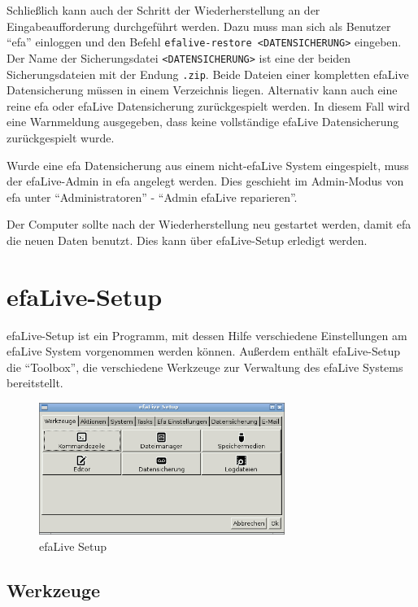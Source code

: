 \documentclass[a4paper,12pt,twoside]{article}
\begin{document}
Schließlich kann auch der Schritt der Wiederherstellung an der
Eingabeaufforderung durchgeführt werden. Dazu muss man sich als
Benutzer "`efa"' einloggen und den Befehl
\texttt{efalive-restore {\textless}DATENSICHERUNG{\textgreater}} eingeben. Der
Name der Sicherungsdatei \texttt{{\textless}DATENSICHERUNG{\textgreater}} ist
eine der beiden Sicherungsdateien mit der Endung \texttt{.zip}. Beide Dateien
einer kompletten efaLive Datensicherung müssen in einem Verzeichnis liegen. 
Alternativ kann auch eine reine efa oder efaLive Datensicherung zurückgespielt
werden. In diesem Fall wird eine Warnmeldung ausgegeben, dass keine vollständige
efaLive Datensicherung zurückgespielt wurde.

Wurde eine efa Datensicherung aus einem nicht-efaLive System eingespielt, muss
der efaLive-Admin in efa angelegt werden. Dies geschieht im Admin-Modus von efa
unter "`Administratoren"' - "`Admin efaLive reparieren"'.

Der Computer sollte nach der Wiederherstellung neu gestartet werden,
damit efa die neuen Daten benutzt. Dies kann über efaLive-Setup
erledigt werden.


\section{efaLive-Setup}
\label{sct:efalivesetup}
efaLive-Setup ist ein Programm, mit
dessen Hilfe verschiedene Einstellungen am efaLive System vorgenommen
werden können. Außerdem enthält efaLive-Setup die
"`Toolbox"', die verschiedene Werkzeuge zur
Verwaltung des efaLive Systems bereitstellt.

\begin{figure}
    \centering
    \includegraphics[width=8cm]{screenshots/efalive_setup.png}
    \caption{efaLive Setup}
    \label{fig:efalivesetup}
\end{figure}

\subsection{Werkzeuge}
\label{sct:efalivesetup_tools}
\end{document}
